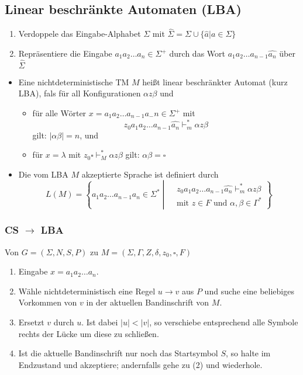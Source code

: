 \documentclass[9pt]{article}
\begin{document}
\subsection{Linear beschränkte Automaten (LBA)}
\begin{enumerate}
	\item Verdoppele das Eingabe-Alphabet $\Sigma$ mit $\hat{\Sigma} = \Sigma \cup \{\hat{a}|a \in \Sigma\}$
	\item Repräsentiere die Eingabe $a_1a_2 \dots a_n \in \Sigma^+$ durch das Wort $a_1a_2 \dots a_{n-1}\hat{a_n}$ über $\hat{\Sigma}$
		
\end{enumerate}
\begin{itemize}
	\item Eine nichtdeterministische TM $M$ heißt linear beschränkter Automat (kurz LBA), fals für all Konfigurationen $\alpha z \beta$ und
	\begin{itemize}
		\item für alle Wörter $x = a_1a_2 \dots a_{n-1}a_-n \in \Sigma^+$ mit
		$$z_0a_1a_2 \dots a_{n-1}\hat{a_n}\vdash^*_m \alpha z \beta$$
		gilt: $|\alpha \beta| = n$, und
		\item für $x = \lambda$ mit $z_0 \square \vdash^*_M \alpha z \beta$ gilt: $\alpha\beta = \square$
	\end{itemize}
	\item Die vom LBA $M$ akzeptierte Sprache ist definiert durch
	$$L(M) = \left\{
					a_1a_2 \dots a_{n-1}a_n \in \Sigma^* \middle|
					\begin{split}
					&z_0a_1a_2 \dots a_{n-1} \hat{a_n} \vdash^*_m \alpha z\beta\\
					&\text{mit } z \in F \text{ und } \alpha, \beta \in \Gamma^*
					\end{split}
		   	\right\}$$
\end{itemize}
\subsubsection{CS $\to$ LBA}
Von $G = (\Sigma, N, S, P)$ zu $M = (\Sigma, \Gamma, Z, \delta, z_0, \square, F)$
\begin{enumerate}
	\item Eingabe $x = a_1a_2 \dots a_n$.
	\item Wähle nichtdeterministisch eine Regel $u \to v$ aus $P$ und suche eine beliebiges Vorkommen von $v$ in der aktuellen Bandinschrift von $M$.
	\item Ersetzt $v$ durch $u$. Ist dabei $|u| < |v|$, so verschiebe entsprechend alle Symbole rechts der Lücke um diese zu schließen.
	\item Ist die aktuelle Bandinschrift nur noch das Startsymbol $S$, so halte im Endzustand und akzeptiere; andernfalls gehe zu (2) und wiederhole.
\end{enumerate}
\end{document}
